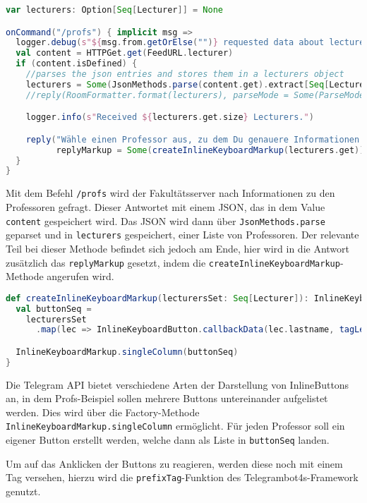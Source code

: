 \begin{lstlisting}[language=scala, style=scala, caption=Reaktion auf das /profs Kommando, label={code:profsCommand}]
var lecturers: Option[Seq[Lecturer]] = None

onCommand("/profs") { implicit msg =>
  logger.debug(s"${msg.from.getOrElse("")} requested data about lecturers")
  val content = HTTPGet.get(FeedURL.lecturer)
  if (content.isDefined) {
    //parses the json entries and stores them in a lecturers object
    lecturers = Some(JsonMethods.parse(content.get).extract[Seq[Lecturer]].sortBy(_.lastname))
    //reply(RoomFormatter.format(lecturers), parseMode = Some(ParseMode.HTML))

    logger.info(s"Received ${lecturers.get.size} Lecturers.")

    reply("Wähle einen Professor aus, zu dem Du genauere Informationen erhalten möchtest.",
          replyMarkup = Some(createInlineKeyboardMarkup(lecturers.get)))
  }
}
\end{lstlisting}

Mit dem Befehl \texttt{/profs} wird der Fakultätsserver nach Informationen zu den Professoren gefragt. Dieser Antwortet mit einem JSON, das in dem Value \texttt{content} gespeichert wird. Das JSON wird dann über \texttt{JsonMethods.parse} geparset und in \texttt{lecturers} gespeichert, einer Liste von Professoren. Der relevante Teil bei dieser Methode befindet sich jedoch am Ende, hier wird in die Antwort zusätzlich das \texttt{replyMarkup} gesetzt, indem die \texttt{createInlineKeyboardMarkup}-Methode angerufen wird.

\begin{lstlisting}[language=scala, style=scala, caption=Erstellen der Professor-Button]
def createInlineKeyboardMarkup(lecturersSet: Seq[Lecturer]): InlineKeyboardMarkup = {
  val buttonSeq =
    lecturersSet
      .map(lec => InlineKeyboardButton.callbackData(lec.lastname, tagLecturer(lec.id.toString)))

  InlineKeyboardMarkup.singleColumn(buttonSeq)
}
\end{lstlisting}

Die Telegram API bietet verschiedene Arten der Darstellung von InlineButtons an, in dem Profs-Beispiel sollen mehrere Buttons untereinander aufgelistet werden. Dies wird über die Factory-Methode \texttt{InlineKeyboardMarkup.singleColumn} ermöglicht. Für jeden Professor soll ein eigener Button erstellt werden, welche dann als Liste in \texttt{buttonSeq} landen.

Um auf das Anklicken der Buttons zu reagieren, werden diese noch mit einem Tag versehen, hierzu wird die \texttt{prefixTag}-Funktion des Telegrambot4s-Framework genutzt.

